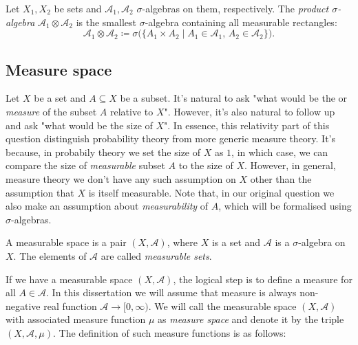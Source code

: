 \begin{definition}
    \label{def:product-sigma-algebra}
    Let $X_1, X_2$ be sets and $\mathcal{A}_1, \mathcal{A}_2$ $\sigma$-algebras on them, respectively. The \emph{product $\sigma$-algebra} $\mathcal{A}_1 \otimes \mathcal{A}_2$ is the smallest $\sigma$-algebra containing all measurable rectangles:
    \[
        \mathcal{A}_1 \otimes \mathcal{A}_2 \coloneq \sigma\bigl(\{A_1 \times A_2 \mid A_1 \in \mathcal{A}_1, \, A_2 \in \mathcal{A}_2\}\bigr).
    \]
\end{definition}

\subsection{Measure space}

Let $X$ be a set and $A \subseteq X$ be a subset. It's natural to ask "what would be the  or \textit{measure} of the subset $A$ relative to $X$". However, it's also natural to follow up and ask "what would be the size of $X$". In essence, this relativity part of this question distinguish probability theory from more generic measure theory. It's because, in probabily theory we set the size of $X$ as $1$, in which case, we can compare the size of \textit{measurable} subset $A$ to the size of $X$. However, in general, measure theory we don't have any such assumption on $X$ other than the assumption that $X$ is itself measurable. Note that, in our original question we also make an assumption about \textit{measurability} of $A$, which will be formalised using $\sigma$-algebras.

\begin{definition}
    A measurable space is a pair $(X, \mathcal{A})$, where $X$ is a set and $\mathcal{A}$ is a $\sigma$-algebra on $X$. The elements of $\mathcal{A}$ are called \emph{measurable sets}.
\end{definition}

If we have a measurable space $(X, \mathcal{A})$, the logical step is to define a measure for all $A \in \mathcal{A}$. In this dissertation we will assume that measure is always non-negative real function $\mathcal{A} \to [0, \infty)$. We will call the measurable space $(X,\mathcal{A})$ with associated measure function $\mu$ as \emph{measure space} and denote it by the triple $(X, \mathcal{A}, \mu)$. The definition of such measure functions is as follows:

